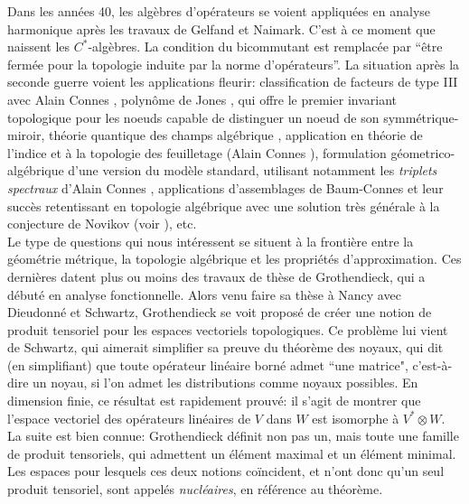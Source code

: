 \documentclass[a4paper,11pt]{article}
\begin{document}
Dans les ann\'ees 40, les alg\`ebres d'op\'erateurs se voient appliqu\'ees en analyse harmonique apr\`es les travaux de Gelfand et Naimark. C'est \`a ce moment que naissent les $C^*$-alg\`ebres. La condition du bicommutant est remplac\'ee par ``\^etre ferm\'ee pour la topologie induite par la norme d'op\'erateurs''. La situation apr\`es la seconde guerre voient les applications fleurir: classification de facteurs de type III avec Alain Connes \cite{connes1976classification}, polyn\^ome de Jones \cite{jones1990hecke}, qui offre le premier invariant topologique pour les noeuds capable de distinguer un noeud de son symm\'etrique-miroir, th\'eorie quantique des champs alg\'ebrique \cite{haag1964algebraic}, application en th\'eorie de l'indice et \`a la topologie des feuilletage (Alain Connes \cite{connesfoliations}), formulation g\'eometrico-alg\'ebrique d'une version du mod\`ele standard, utilisant notamment les \textit{triplets spectraux} d'Alain Connes \cite{chamseddine1996universal}, applications d'assemblages de Baum-Connes \cite{BaumConnesHigson} et leur succ\`es retentissant en topologie alg\'ebrique avec une solution tr\`es g\'en\'erale \`a la conjecture de Novikov (voir \cite{HigsonKasparov}), etc. \\

Le type de questions qui nous int\'eressent se situent \`a la fronti\`ere entre la g\'eom\'etrie m\'etrique, la topologie alg\'ebrique et les propri\'et\'es d'approximation. Ces derni\`eres datent plus ou moins des travaux de th\`ese de Grothendieck, qui a d\'ebut\'e en analyse fonctionnelle. Alors venu faire sa th\`ese \`a Nancy avec Dieudonn\'e et Schwartz, Grothendieck se voit propos\'e de cr\'eer une notion de produit tensoriel pour les espaces vectoriels topologiques. Ce probl\`eme lui vient de Schwartz, qui aimerait simplifier sa preuve du th\'eor\`eme des noyaux, qui dit (en simplifiant) que toute op\'erateur lin\'eaire born\'e admet ``une matrice", c'est-\`a-dire un noyau, si l'on admet les distributions comme noyaux possibles. En dimension finie, ce r\'esultat est rapidement prouv\'e: il s'agit de montrer que l'espace vectoriel des op\'erateurs lin\'eaires de $V$ dans $W$ est isomorphe \`a $V^* \otimes W$. La suite est bien connue: Grothendieck d\'efinit non pas un, mais toute une famille de produit tensoriels, qui admettent un \'el\'ement maximal et un \'el\'ement minimal. Les espaces pour lesquels ces deux notions co\"incident, et n'ont donc qu'un seul produit tensoriel, sont appel\'es \textit{nucl\'eaires}, en r\'ef\'erence au th\'eor\`eme.\\
\end{document}
